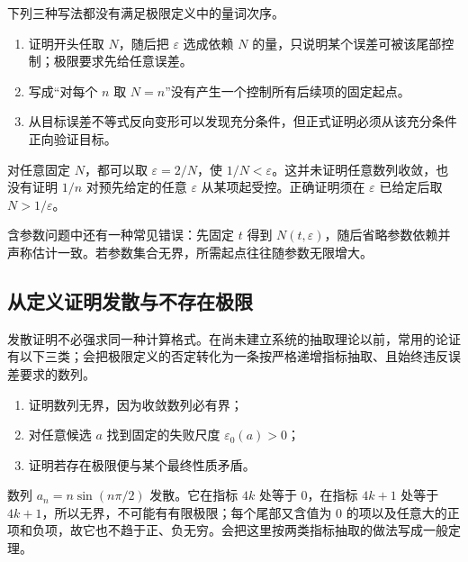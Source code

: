 下列三种写法都没有满足极限定义中的量词次序。

\begin{enumerate}
 \item {} 证明开头任取 \(N\)，随后把 \(\varepsilon\) 选成依赖 \(N\) 的量，只说明某个误差可被该尾部控制；极限要求先给任意误差。
 \item {} 写成“对每个 \(n\) 取 \(N=n\)”没有产生一个控制所有后续项的固定起点。
 \item {} 从目标误差不等式反向变形可以发现充分条件，但正式证明必须从该充分条件正向验证目标。
\end{enumerate}

\begin{counterexample}
对任意固定 \(N\)，都可以取 \(\varepsilon=2/N\)，使 \(1/N<\varepsilon\)。这并未证明任意数列收敛，也没有证明 \(1/n\) 对预先给定的任意 \(\varepsilon\) 从某项起受控。正确证明须在 \(\varepsilon\) 已给定后取 \(N>1/\varepsilon\)。
\end{counterexample}

含参数问题中还有一种常见错误：先固定 \(t\) 得到 \(N(t,\varepsilon)\)，随后省略参数依赖并声称估计一致。若参数集合无界，所需起点往往随参数无限增大。

\subsection{从定义证明发散与不存在极限}

发散证明不必强求同一种计算格式。在尚未建立系统的抽取理论以前，常用的论证有以下三类；会把极限定义的否定转化为一条按严格递增指标抽取、且始终违反误差要求的数列。

\begin{enumerate}
 \item 证明数列无界，因为收敛数列必有界；
 \item 对任意候选 \(a\) 找到固定的失败尺度 \(\varepsilon_0(a)>0\)；
 \item 证明若存在极限便与某个最终性质矛盾。
\end{enumerate}

\begin{example}
数列 \(a_n=n\sin(n\pi/2)\) 发散。它在指标 \(4k\) 处等于 \(0\)，在指标 \(4k+1\) 处等于 \(4k+1\)，所以无界，不可能有有限极限；每个尾部又含值为 \(0\) 的项以及任意大的正项和负项，故它也不趋于正、负无穷。会把这里按两类指标抽取的做法写成一般定理。
\end{example}

